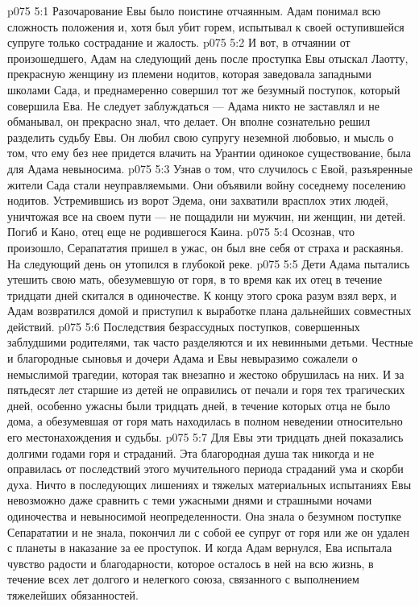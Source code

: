 \vs p075 5:1 Разочарование Евы было поистине отчаянным. Адам понимал всю сложность положения и, хотя был убит горем, испытывал к своей оступившейся супруге только сострадание и жалость.
\vs p075 5:2 И вот, в отчаянии от произошедшего, Адам на следующий день после проступка Евы отыскал Лаотту, прекрасную женщину из племени нодитов, которая заведовала западными школами Сада, и преднамеренно совершил тот же безумный поступок, который совершила Ева. Не следует заблуждаться --- Адама никто не заставлял и не обманывал, он прекрасно знал, что делает. Он вполне сознательно решил разделить судьбу Евы. Он любил свою супругу неземной любовью, и мысль о том, что ему без нее придется влачить на Урантии одинокое существование, была для Адама невыносима.
\vs p075 5:3 Узнав о том, что случилось с Евой, разъяренные жители Сада стали неуправляемыми. Они объявили войну соседнему поселению нодитов. Устремившись из ворот Эдема, они захватили врасплох этих людей, уничтожая все на своем пути --- не пощадили ни мужчин, ни женщин, ни детей. Погиб и Кано, отец еще не родившегося Каина.
\vs p075 5:4 Осознав, что произошло, Серапататия пришел в ужас, он был вне себя от страха и раскаянья. На следующий день он утопился в глубокой реке.
\vs p075 5:5 Дети Адама пытались утешить свою мать, обезумевшую от горя, в то время как их отец в течение тридцати дней скитался в одиночестве. К концу этого срока разум взял верх, и Адам возвратился домой и приступил к выработке плана дальнейших совместных действий.
\vs p075 5:6 Последствия безрассудных поступков, совершенных заблудшими родителями, так часто разделяются и их невинными детьми. Честные и благородные сыновья и дочери Адама и Евы невыразимо сожалели о немыслимой трагедии, которая так внезапно и жестоко обрушилась на них. И за пятьдесят лет старшие из детей не оправились от печали и горя тех трагических дней, особенно ужасны были тридцать дней, в течение которых отца не было дома, а обезумевшая от горя мать находилась в полном неведении относительно его местонахождения и судьбы.
\vs p075 5:7 Для Евы эти тридцать дней показались долгими годами горя и страданий. Эта благородная душа так никогда и не оправилась от последствий этого мучительного периода страданий ума и скорби духа. Ничто в последующих лишениях и тяжелых материальных испытаниях Евы невозможно даже сравнить с теми ужасными днями и страшными ночами одиночества и невыносимой неопределенности. Она знала о безумном поступке Сепарататии и не знала, покончил ли с собой ее супруг от горя или же он удален с планеты в наказание за ее проступок. И когда Адам вернулся, Ева испытала чувство радости и благодарности, которое осталось в ней на всю жизнь, в течение всех лет долгого и нелегкого союза, связанного с выполнением тяжелейших обязанностей.
